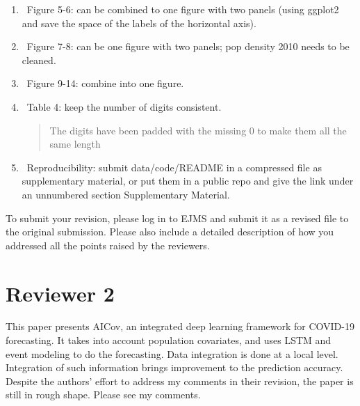 \documentclass[12pt]{article}
\theoremstyle{definition}
\renewcommand{\_}{%
    \textunderscore\hspace{0pt}%
}
\newcommand{\DONE}{{\color{green!60!black}\makebox[0pt][l]{$\square$}\raisebox{.15ex}{\hspace{0.1em}$\checkmark$}}~}
\newcommand{\DOIT}{{\color{red!60!black}\makebox[0pt][l]{$\square$}\raisebox{.15ex}{\hspace{0.1em}$\boxtimes}}~}
\begin{document}
\begin{enumerate}
\item \DOIT  Figure 5-6: can be combined to one figure with two panels (using ggplot2 and save the space of the labels of the horizontal axis).

\begin{quote}
\end{quote}

\item \DOIT  Figure 7-8: can be one figure with two panels; pop density 2010 needs to be cleaned.

\begin{quote}
\end{quote}

\item \DOIT  Figure 9-14: combine into one figure.

\begin{quote}
\end{quote}

\item \DONE  Table 4: keep the number of digits consistent.

\begin{quote}
    The digits have been padded with the missing 0 to make them all the same length
\end{quote}

\item \DOIT  Reproducibility: submit data/code/README in a compressed file as supplementary material, or put them in a public repo and give the link under an unnumbered section Supplementary Material.

\begin{quote}
\end{quote}

\end{enumerate}

To submit your revision, please log in to EJMS and submit it as a revised file to the original submission. Please also include a detailed description of how you addressed all the points raised by the reviewers.

\section*{Reviewer 2}

This paper presents AICov, an integrated deep learning framework for COVID-19 forecasting. It takes into account population covariates, and uses LSTM and event modeling to do the forecasting. Data integration is done at a local level. Integration of such information brings improvement to the prediction accuracy. Despite the authors’ effort to address my comments in their revision, the paper is still in rough shape. Please see my comments.
\end{document}
